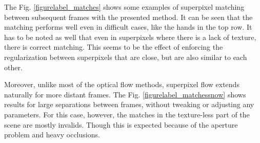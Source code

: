 The Fig. \ref{figurelabel_matches} shows some examples of superpixel matching between subsequent frames with the presented method. 
It can be seen that the matching performs well even in difficult cases, like the hands in the top row. It has to be noted
as well that even in superpixels where there is a lack of texture, there is correct matching. This seems to be
the effect of enforcing the regularization between superpixels that are close, but are also similar to
each other.
 
Moreover, unlike most of the optical flow methods, superpixel flow extends 
 naturally for more distant frames. 
The Fig. \ref{figurelabel_matchessnow} shows
 results for large separations between frames, without tweaking or adjusting any parameters. 
For this case, however, the matches in the texture-less part of the scene
 are mostly invalids. Though this is expected because of the aperture problem and
 heavy occlusions.
